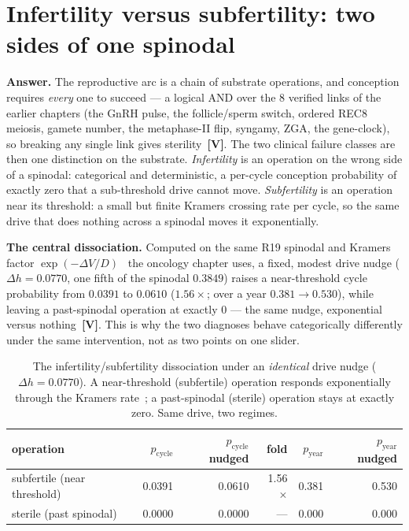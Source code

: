 \documentclass[11pt]{article}
\newcommand{\gradeV}{\textcolor{verified}{\textbf{[V]}}}
\begin{document}
\section{Infertility versus subfertility: two sides of one spinodal}

\textbf{Answer.} The reproductive arc is a chain of substrate operations, and conception requires
\emph{every} one to succeed --- a logical AND over the 8 verified links of the
earlier chapters (the GnRH pulse, the follicle/sperm switch, ordered REC8 meiosis, gamete number, the
metaphase-II flip, syngamy, ZGA, the gene-clock), so breaking any single link gives
sterility~\gradeV{}. The two clinical failure classes are then one distinction on the substrate.
\emph{Infertility} is an operation on the wrong side of a spinodal: categorical and deterministic, a
per-cycle conception probability of exactly zero that a sub-threshold drive cannot move. \emph{Subfertility}
is an operation near its threshold: a small but finite Kramers crossing rate per cycle, so the same drive
that does nothing across a spinodal moves it exponentially.

\textbf{The central dissociation.} Computed on the same R19 spinodal and Kramers factor
$\exp(-\Delta V/D)$~\cite{kramers} the oncology chapter uses, a fixed, modest drive nudge
($\Delta h = 0.0770$, one fifth of the spinodal
$0.3849$) raises a near-threshold cycle probability from
$0.0391$ to $0.0610$
($1.56\times$; over a year
$0.381 \to 0.530$), while leaving a
past-spinodal operation at exactly $0$ --- the same nudge, exponential
versus nothing~\gradeV{}. This is why the two diagnoses behave categorically differently under the same
intervention, not as two points on one slider.

\begin{table}[H]
\centering
\small
\caption{The infertility/subfertility dissociation under an \emph{identical} drive nudge ($\Delta h = 0.0770$). A near-threshold (subfertile) operation responds exponentially through the Kramers rate~\cite{kramers}; a past-spinodal (sterile) operation stays at exactly zero. Same drive, two regimes.}
\label{tab:infertility-dissociation}
\begin{tabular}{lrrrrr}
\toprule
operation & $p_{\mathrm{cycle}}$ & $p_{\mathrm{cycle}}$ nudged & fold & $p_{\mathrm{year}}$ & $p_{\mathrm{year}}$ nudged \\
\midrule
subfertile (near threshold) & 0.0391 & 0.0610 & 1.56$\times$ & 0.381 & 0.530 \\
sterile (past spinodal) & 0.0000 & 0.0000 & --- & 0.000 & 0.000 \\
\bottomrule
\end{tabular}
\end{table}
\end{document}
